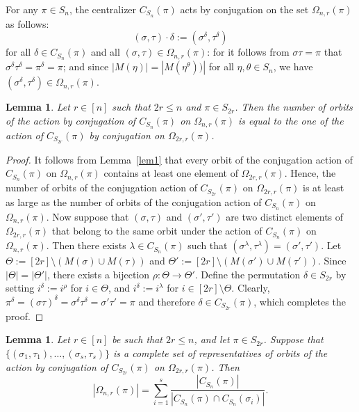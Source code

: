 \documentclass{amsart}
\newtheorem{lem}[thm]{Lemma}
\numberwithin{equation}{section}
\begin{document}
For any $\pi\in S_n$, the centralizer $C_{S_n}(\pi)$ acts by conjugation on the set $\Omega_{n,r}(\pi)$ as follows:
$$(\sigma,\tau)\cdot \delta:=(\sigma^\delta,\tau^\delta)$$
for all $\delta \in C_{S_n}(\pi)$ and all $(\sigma,\tau)\in \Omega_{n,r}(\pi)$: for it follows from 
 $\sigma \tau =\pi$ that $\sigma^\delta \tau^\delta =\pi^\delta=\pi$; and since $|M(\eta)|=|M(\eta^\theta))|$ for all $\eta,\theta \in S_n$, we have $(\sigma^\delta,\tau^\delta)\in \Omega_{n,r}(\pi)$.

\begin{lem} \label{lem2}
Let $r\in [n]$ such that $2r\leq n$ and  $\pi \in S_{2r}$. Then   the number of orbits of the action by conjugation of $C_{S_n}(\pi)$ on $\Omega_{n,r}(\pi)$ is equal to the one of the action of $C_{S_{2r}}(\pi)$ by conjugation on $\Omega_{2r,r}(\pi)$. 
\end{lem}
\begin{proof}
	It follows from Lemma~\ref{lem1} that every orbit of the conjugation action of $C_{S_n}(\pi)$ on $\Omega_{n,r}(\pi)$ contains at least one element of $\Omega_{2r,r}(\pi)$. Hence, the number of orbits of the conjugation action of $C_{S_{2r}}(\pi)$ on $\Omega_{2r,r}(\pi)$ is at least as large as the number of orbits of the conjugation action of $C_{S_n}(\pi)$ on $\Omega_{n,r}(\pi)$.
Now suppose that $(\sigma,\tau)$ and $(\sigma',\tau')$ are two distinct elements of $\Omega_{2r,r}(\pi)$ that belong to the same orbit under the action of $C_{S_n}(\pi)$ on $\Omega_{n,r}(\pi)$. Then there exists $\lambda \in C_{S_n}(\pi)$ such that $(\sigma^\lambda,\tau^\lambda) = (\sigma',\tau')$.
Let $\Theta := [2r] \setminus (M(\sigma) \cup M(\tau))$ and $\Theta' := [2r] \setminus (M(\sigma') \cup M(\tau'))$. Since $|\Theta| = |\Theta'|$, there exists a bijection $\rho : \Theta \to \Theta'$. Define the permutation $\delta \in S_{2r}$ by setting $i^\delta := i^\rho$ for $i \in \Theta$, and $i^\delta := i^\lambda$ for $i \in [2r] \setminus \Theta$. Clearly, $\pi^\delta=(\sigma\tau)^\delta=\sigma^\delta\tau^\delta=\sigma'\tau'=\pi$ and therefore $\delta \in C_{S_{2r}}(\pi)$, which completes the proof.
\end{proof}
\begin{lem}\label{lem3}
Let $r\in [n]$ be such that $2r\leq n$, and let $\pi \in S_{2r}$. Suppose that  $\{(\sigma_1,\tau_1),\dots,(\sigma_s,\tau_s)\}$ is a complete set of  representatives of orbits of the action by conjugation of $C_{S_{2r}}(\pi)$ on $\Omega_{2r,r}(\pi)$. Then 
$$|\Omega_{n,r}(\pi)|=\sum_{i=1}^s \frac{|C_{S_n}(\pi)|}{|C_{S_n}(\pi) \cap C_{S_n}(\sigma_i)|}.$$
\end{lem}
\end{document}
